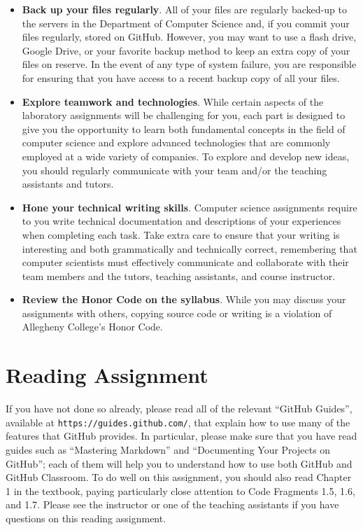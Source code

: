 \documentclass[11pt]{article}
\newcommand{\url}[1]{\lstinline{#1}}
\begin{document}
\begin{itemize}
\item {\bf Back up your files regularly}. All of your files are regularly backed-up to the servers in the Department of
  Computer Science and, if you commit your files regularly, stored on GitHub. However, you may want to use a flash
  drive, Google Drive, or your favorite backup method to keep an extra copy of your files on reserve. In the event of
  any type of system failure, you are responsible for ensuring that you have access to a recent backup copy of all your
  files.

\item {\bf Explore teamwork and technologies}. While certain aspects of the laboratory assignments will be challenging
  for you, each part is designed to give you the opportunity to learn both fundamental concepts in the field of computer
  science and explore advanced technologies that are commonly employed at a wide variety of companies. To explore and
  develop new ideas, you should regularly communicate with your team and/or the teaching assistants and tutors.

\item {\bf Hone your technical writing skills}. Computer science assignments require to you write technical
  documentation and descriptions of your experiences when completing each task. Take extra care to ensure that your
  writing is interesting and both grammatically and technically correct, remembering that computer scientists must
  effectively communicate and collaborate with their team members and the tutors, teaching assistants, and course
  instructor.

\item {\bf Review the Honor Code on the syllabus}. While you may discuss your assignments with others, copying source
  code or writing is a violation of Allegheny College's Honor Code.

\end{itemize}

\section*{Reading Assignment}

If you have not done so already, please read all of the relevant ``GitHub Guides'', available at
\url{https://guides.github.com/}, that explain how to use many of the features that GitHub provides. In particular,
please make sure that you have read guides such as ``Mastering Markdown'' and ``Documenting Your Projects on GitHub'';
each of them will help you to understand how to use both GitHub and GitHub Classroom. To do well on this assignment, you
should also read Chapter 1 in the textbook, paying particularly close attention to Code Fragments 1.5, 1.6, and 1.7.
Please see the instructor or one of the teaching assistants if you have questions on this reading assignment.
\end{document}
